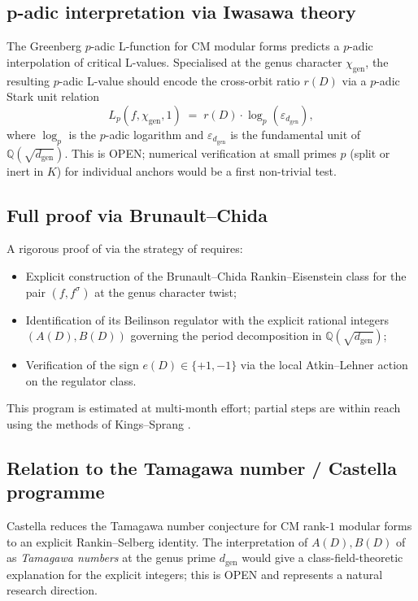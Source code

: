 \documentclass[11pt]{amsart}
\theoremstyle{definition}
\theoremstyle{remark}
\newcommand{\Q}{\mathbb{Q}}
\begin{document}
\subsection{p-adic interpretation via Iwasawa theory}

The Greenberg \(p\)-adic L-function for CM modular forms
\cite{Greenberg1994} predicts a \(p\)-adic interpolation of
critical L-values. Specialised at the genus character
\(\chi_{\mathrm{gen}}\), the resulting \(p\)-adic L-value should
encode the cross-orbit ratio \(r(D)\) via a \(p\)-adic Stark unit
relation
\[
   L_{p}(f, \chi_{\mathrm{gen}}, 1)
   \;=\; r(D) \cdot \log_{p}(\varepsilon_{d_{\mathrm{gen}}}) ,
\]
where \(\log_{p}\) is the \(p\)-adic logarithm and
\(\varepsilon_{d_{\mathrm{gen}}}\) is the fundamental unit of
\(\Q(\sqrt{d_{\mathrm{gen}}})\). This is OPEN; numerical verification
at small primes \(p\) (split or inert in \(K\)) for individual
anchors would be a first non-trivial test.

\subsection{Full proof via Brunault--Chida}

A rigorous proof of  via the strategy of
 requires:
\begin{itemize}
\item Explicit construction of the Brunault--Chida Rankin--Eisenstein
  class for the pair \((f, f^{\sigma})\) at the genus character
  twist;
\item Identification of its Beilinson regulator with the explicit
  rational integers \((A(D), B(D))\) governing the period decomposition
  in \(\Q(\sqrt{d_{\mathrm{gen}}})\);
\item Verification of the sign \(e(D) \in \{+1, -1\}\) via the
  local Atkin--Lehner action on the regulator class.
\end{itemize}
This program is estimated at multi-month effort; partial steps are
within reach using the methods of Kings--Sprang \cite{KingsSprang2025}.

\subsection{Relation to the Tamagawa number / Castella programme}

Castella \cite{Castella2024} reduces the Tamagawa number conjecture
for CM rank-\(1\) modular forms to an explicit Rankin--Selberg
identity. The interpretation of \(A(D), B(D)\) of 
as \emph{Tamagawa numbers} at the genus prime \(d_{\mathrm{gen}}\)
would give a class-field-theoretic explanation for the explicit
integers; this is OPEN and represents a natural research direction.
\end{document}
